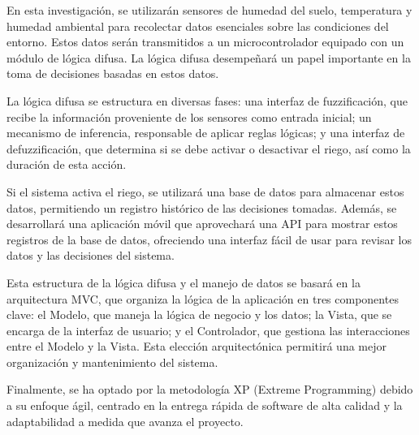 En esta investigación, se utilizarán sensores de humedad del suelo, temperatura
y humedad ambiental para recolectar datos esenciales sobre las condiciones del
entorno. Estos datos serán transmitidos a un microcontrolador equipado con un
módulo de lógica difusa. La lógica difusa desempeñará un papel importante en la
toma de decisiones basadas en estos datos.

\bigbreak
La lógica difusa se estructura en diversas fases: una interfaz de fuzzificación, que recibe la información proveniente de los sensores como entrada inicial; un mecanismo de inferencia, responsable de aplicar reglas lógicas; y una interfaz de defuzzificación, que determina si se debe activar o desactivar el riego, así como la duración de esta acción.

\bigbreak
Si el sistema activa el riego, se utilizará una base de datos para almacenar estos datos, permitiendo un registro histórico de las decisiones tomadas. Además, se desarrollará una aplicación móvil que aprovechará una API para mostrar estos registros de la base de datos, ofreciendo una interfaz fácil de usar para revisar los datos y las decisiones del sistema.

\bigbreak
Esta estructura de la lógica difusa y el manejo de datos se basará en la arquitectura MVC, que organiza la lógica de la aplicación en tres componentes clave: el Modelo, que maneja la lógica de negocio y los datos; la Vista, que se encarga de la interfaz de usuario; y el Controlador, que gestiona las interacciones entre el Modelo y la Vista. Esta elección arquitectónica permitirá una mejor organización y mantenimiento del sistema.

\bigbreak
Finalmente, se ha optado por la metodología XP (Extreme Programming) debido a su enfoque ágil, centrado en la entrega rápida de software de alta calidad y la adaptabilidad a medida que avanza el proyecto.

